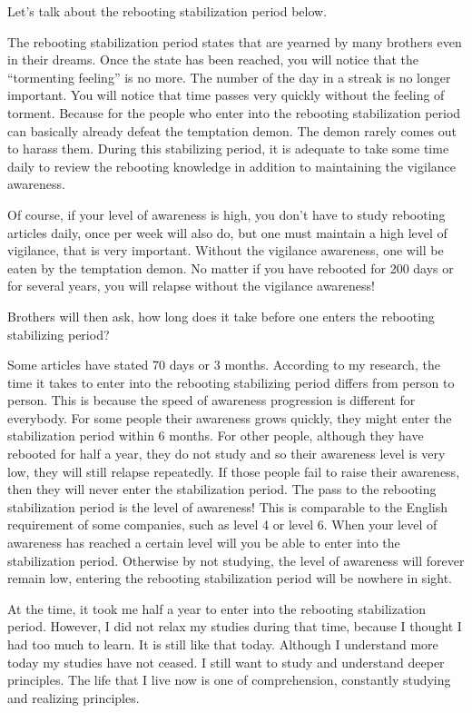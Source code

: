 \documentclass[
]{book}
\begin{document}
Let's talk about the rebooting stabilization period below.

The rebooting stabilization period states that are yearned by many brothers even in their dreams. Once the state has been reached, you will notice that the ``tormenting feeling'' is no more. The number of the day in a streak is no longer important. You will notice that time passes very quickly without the feeling of torment. Because for the people who enter into the rebooting stabilization period can basically already defeat the temptation demon. The demon rarely comes out to harass them. During this stabilizing period, it is adequate to take some time daily to review the rebooting knowledge in addition to maintaining the vigilance awareness.

Of course, if your level of awareness is high, you don't have to study rebooting articles daily, once per week will also do, but one must maintain a high level of vigilance, that is very important. Without the vigilance awareness, one will be eaten by the temptation demon. No matter if you have rebooted for 200 days or for several years, you will relapse without the vigilance awareness!

Brothers will then ask, how long does it take before one enters the rebooting stabilizing period?

Some articles have stated 70 days or 3 months. According to my research, the time it takes to enter into the rebooting stabilizing period differs from person to person. This is because the speed of awareness progression is different for everybody. For some people their awareness grows quickly, they might enter the stabilization period within 6 months. For other people, although they have rebooted for half a year, they do not study and so their awareness level is very low, they will still relapse repeatedly. If those people fail to raise their awareness, then they will never enter the stabilization period. The pass to the rebooting stabilization period is the level of awareness! This is comparable to the English requirement of some companies, such as level 4 or level 6. When your level of awareness has reached a certain level will you be able to enter into the stabilization period. Otherwise by not studying, the level of awareness will forever remain low, entering the rebooting stabilization period will be nowhere in sight.

At the time, it took me half a year to enter into the rebooting stabilization period. However, I did not relax my studies during that time, because I thought I had too much to learn. It is still like that today. Although I understand more today my studies have not ceased. I still want to study and understand deeper principles. The life that I live now is one of comprehension, constantly studying and realizing principles.
\end{document}
